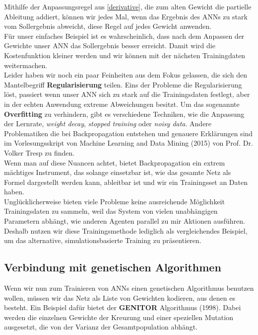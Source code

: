             \noindent
            Mithilfe der Anpassungsregel aus \ref{derivative}, die zum alten Gewicht die partielle Ableitung addiert, können wir jedes Mal, wenn das Ergebnis des ANNs zu stark vom Sollergebnis abweicht, diese Regel auf jedes Gewicht anwenden.\\

            \noindent
            Für unser einfaches Beispiel ist es wahrscheinlich, dass nach dem Anpassen der Gewichte unser ANN das Sollergebnis besser erreicht. Damit wird die Kostenfunktion kleiner werden und wir können mit der nächsten Trainingdaten weitermachen. \\

            \noindent
            Leider haben wir noch ein paar Feinheiten aus dem Fokus gelassen, die sich den Mantelbegriff \textbf{Regularisierung} teilen. Eins der Probleme die Regularisierung löst, passiert wenn unser ANN sich zu stark auf die Trainingsdaten festlegt, aber in der echten Anwendung extreme Abweichungen besitzt. Um das sogenannte \textbf{Overfitting} zu verhindern, gibt es verschiedene Techniken, wie die Anpassung der Lernrate, \textit{weight decay}, \textit{stopped training} oder \textit{noisy data}. Andere Problematiken die bei Backpropagation entstehen und genauere Erklärungen sind im Vorlesungsskript von Machine Learning and Data Mining (2015) von Prof. Dr. Volker Tresp \cite{ml-script} zu finden.\\

            \noindent
            Wenn man auf diese Nuancen achtet, bietet Backpropagation ein extrem mächtiges Instrument, das solange einsetzbar ist, wie das gesamte Netz als Formel dargestellt werden kann, ableitbar ist und wir ein Trainingsset an Daten haben.\\

            \noindent
            Unglücklicherweise bieten viele Probleme keine ausreichende Möglichkeit Trainingsdaten zu sammeln, weil das System von vielen unabhängigen Parametern abhängt, wie anderen Agenten parallel zu mir Aktionen ausführen. Deshalb nutzen wir diese Trainingsmethode lediglich als vergleichendes Beispiel, um das alternative, simulationsbasierte Training zu präsentieren.

        \subsection{Verbindung mit genetischen Algorithmen}
            Wenn wir nun zum Trainieren von ANNs einen genetischen Algorithmus benutzen wollen, müssen wir das Netz als Liste von Gewichten kodieren, aus denen es besteht. Ein Beispiel dafür bietet der \textbf{GENITOR}\cite{moriarty1999evolutionary} Algorithmus (1998). Dabei werden die einzelnen Gewichte der Kreuzung und einer speziellen Mutation ausgesetzt, die von der Varianz der Gesamtpopulation abhängt. \\

